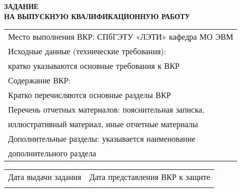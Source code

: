 \begin{center}
	\textbf{
		ЗАДАНИЕ \\
		НА ВЫПУСКНУЮ КВАЛИФИКАЦИОННУЮ РАБОТУ
	}

	\vspace*{2cm}

	\confirmation

	\vspace*{2.5cm}
	
	\worktitle
	\begin{tabularx}{\textwidth}{ X }
		Место выполнения ВКР: СПбГЭТУ «ЛЭТИ» кафедра МО ЭВМ \\
		Исходные данные (технические требования): \\
		кратко указываются основные требования к ВКР \\
		Содержание ВКР: \\
		Кратко перечисляются основные разделы ВКР \\
		Перечень отчетных материалов: пояснительная записка, \\ иллюстративный материал, иные отчетные материалы \\
		Дополнительные разделы: указывается наименование \\ дополнительного раздела
	\end{tabularx}

	\vspace*{2cm}
	
	\begin{tabularx}{\textwidth}{ X X }
		Дата выдачи задания & Дата представления ВКР к защите \\
		\emptydate & \emptydate
	\end{tabularx}

	\vspace*{2.5cm}

	\subsblock
\end{center}

\thispagestyle{empty}
\clearpage
